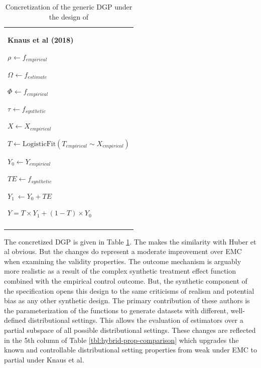 \documentclass[../main.tex]{subfiles}
\begin{document}
\begin{table}[H]
 			\centering
\begin{tabular}{p{3.14in}}
\hline
\multicolumn{1}{|p{3.14in}|}{\textbf{Knaus et al (2018)} \par  \(  \rho _{} \leftarrow f_{empirical}~ \)  \par  \(  \Omega _{} \leftarrow f_{estimate} \)  \par  \(  \Phi _{} \leftarrow f_{empirical} \)  \par  \(  \tau_{} \leftarrow f_{synthetic}~ \)  \par  \( X \leftarrow X_{empirical} \)  \par  \( T \leftarrow \text{LogisticFit} \left(  T_{empirical} \sim X_{empirical} \right)  \)  \par  \( Y_{0} \leftarrow Y_{empirical} \)  \par  \( TE \leftarrow f_{synthetic} \)  \par  \( Y_{1}~ \leftarrow Y_{0}+ TE \)  \par  \( Y = T \times Y_{1}+  \left( 1-T \right)  \times Y_{0} \)  \par } \\
\hhline{-}
\end{tabular}
\caption{Concretization of the generic DGP under the design of \textcite{Knaus2018MachineEvidence}}
\label{tbl:knaus-hybrid}
\end{table}

The concretized DGP is given in Table \ref{tbl:knaus-hybrid}. The makes the similarity with Huber et al obvious. But the changes do represent a moderate improvement over EMC when examining the validity properties. The outcome mechanism is arguably more realistic as a result of the complex synthetic treatment effect function combined with the empirical control outcome. But, the synthetic component of the specification opens this design to the same criticisms of realism and potential bias as any other synthetic design. The primary contribution of these authors is the parameterization of the functions to generate datasets with different, well-defined distributional settings. This allows the evaluation of estimators over a partial subspace of all possible distributional settings. These changes are reflected in the 5th column of Table \ref{tbl:hybrid-prop-comparison} which upgrades the known and controllable distributional setting properties from weak under EMC to partial under Knaus et al.\par
\end{document}
